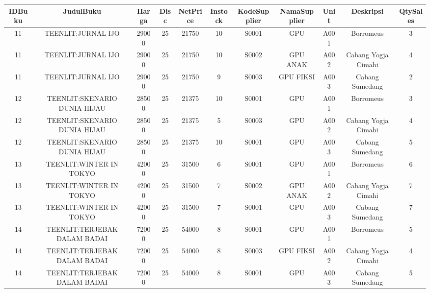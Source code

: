 \documentclass[12pt,a4paper]{article}
\begin{document}
\begin{enumerate}
\begin{enumerate}
            \begin{center}
              \begin{adjustbox}{scale=0.5,center}
                \begin{tabular}{ |c|c|c|c|c|c|c|c|c|c|c| } \hline
                  IDBuku & JudulBuku                    & Harga & Disc & NetPrice & Instock & KodeSupplier & NamaSupplier & Unit & Deskripsi           & QtySales \\ \hline
                  11     & TEENLIT:JURNAL IJO           & 29000 & 25   & 21750    & 10      & S0001        & GPU          & A001 & Borromeus           & 3        \\ \hline
                  11     & TEENLIT:JURNAL IJO           & 29000 & 25   & 21750    & 10      & S0002        & GPU ANAK     & A002 & Cabang Yogja Cimahi & 4        \\ \hline
                  11     & TEENLIT:JURNAL IJO           & 29000 & 25   & 21750    & 9       & S0003        & GPU FIKSI    & A003 & Cabang Sumedang     & 2        \\ \hline
                  12     & TEENLIT:SKENARIO DUNIA HIJAU & 28500 & 25   & 21375    & 10      & S0001        & GPU          & A001 & Borromeus           & 3        \\ \hline
                  12     & TEENLIT:SKENARIO DUNIA HIJAU & 28500 & 25   & 21375    & 5       & S0003        & GPU          & A002 & Cabang Yogja Cimahi & 4        \\ \hline
                  12     & TEENLIT:SKENARIO DUNIA HIJAU & 28500 & 25   & 21375    & 10      & S0001        & GPU          & A003 & Cabang Sumedang     & 5        \\ \hline
                  13     & TEENLIT:WINTER IN TOKYO      & 42000 & 25   & 31500    & 6       & S0001        & GPU          & A001 & Borromeus           & 6        \\ \hline
                  13     & TEENLIT:WINTER IN TOKYO      & 42000 & 25   & 31500    & 7       & S0002        & GPU ANAK     & A002 & Cabang Yogja Cimahi & 7        \\ \hline
                  13     & TEENLIT:WINTER IN TOKYO      & 42000 & 25   & 31500    & 7       & S0001        & GPU          & A003 & Cabang Sumedang     & 7        \\ \hline
                  14     & TEENLIT:TERJEBAK DALAM BADAI & 72000 & 25   & 54000    & 8       & S0001        & GPU          & A001 & Borromeus           & 5        \\ \hline
                  14     & TEENLIT:TERJEBAK DALAM BADAI & 72000 & 25   & 54000    & 8       & S0003        & GPU FIKSI    & A002 & Cabang Yogja Cimahi & 4        \\ \hline
                  14     & TEENLIT:TERJEBAK DALAM BADAI & 72000 & 25   & 54000    & 8       & S0001        & GPU          & A003 & Cabang Sumedang     & 5        \\ \hline
                \end{tabular}
              \end{adjustbox}
            \end{center}



\end{enumerate}
\end{enumerate}
\end{document}
